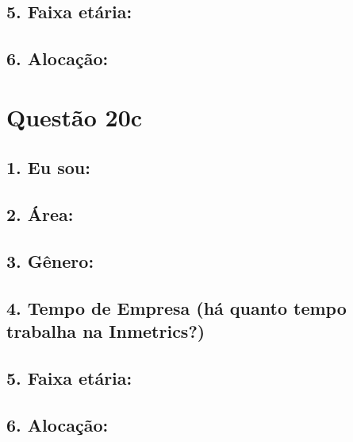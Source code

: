 \documentclass[]{book}
\begin{document}
\hypertarget{faixa-etaria-54}{%
\subsection{5. Faixa etária:}\label{faixa-etaria-54}}

\hypertarget{alocacao-54}{%
\subsection{6. Alocação:}\label{alocacao-54}}

\hypertarget{questao-20c}{%
\section{Questão 20c}\label{questao-20c}}

\hypertarget{eu-sou-55}{%
\subsection{1. Eu sou:}\label{eu-sou-55}}

\hypertarget{area-55}{%
\subsection{2. Área:}\label{area-55}}

\hypertarget{genero-55}{%
\subsection{3. Gênero:}\label{genero-55}}

\hypertarget{tempo-de-empresa-ha-quanto-tempo-trabalha-na-inmetrics-55}{%
\subsection{4. Tempo de Empresa (há quanto tempo trabalha na Inmetrics?)}\label{tempo-de-empresa-ha-quanto-tempo-trabalha-na-inmetrics-55}}

\hypertarget{faixa-etaria-55}{%
\subsection{5. Faixa etária:}\label{faixa-etaria-55}}

\hypertarget{alocacao-55}{%
\subsection{6. Alocação:}\label{alocacao-55}}
\end{document}
